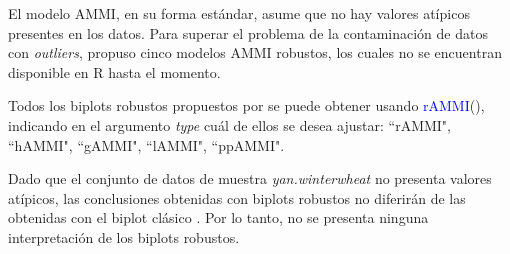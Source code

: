 

El modelo AMMI, en su forma estándar, asume que no hay valores atípicos presentes en los datos. Para superar el problema de la contaminación de datos con \emph{outliers}, \citet{Rodriguesetal2016} propuso cinco modelos AMMI robustos, los cuales no se encuentran disponible en R hasta el momento. 

Todos los biplots robustos propuestos por \citet{Rodriguesetal2016} se puede obtener usando \textcolor{blue}{rAMMI}(), indicando en el argumento \emph{type} cuál de ellos se desea ajustar: ``rAMMI", ``hAMMI", ``gAMMI", ``lAMMI", ``ppAMMI".

Dado que el conjunto de datos de muestra \emph{yan.winterwheat} no presenta valores atípicos, las conclusiones obtenidas con biplots robustos no diferirán de las obtenidas con el biplot clásico \citep{Rodriguesetal2016}. Por lo tanto, no se presenta ninguna interpretación de los biplots robustos. \\


